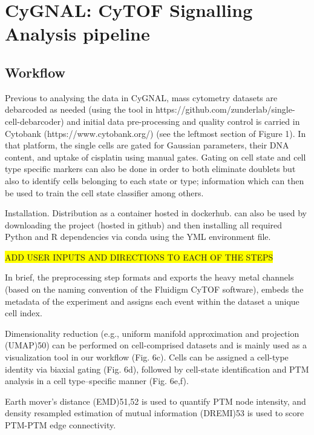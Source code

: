 \section{CyGNAL: CyTOF Signalling Analysis pipeline}

\subsection{Workflow}

Previous to analysing the data in CyGNAL, mass cytometry datasets are debarcoded as needed (using the tool in https://github.com/zunderlab/single-cell-debarcoder) and initial data pre-processing and quality control is carried in Cytobank (https://www.cytobank.org/) (see the leftmost section of Figure 1). In that platform, the single cells are gated for Gaussian parameters, their DNA content, and uptake of cisplatin using manual gates. Gating on cell state and cell type specific markers can also be done in order to both eliminate doublets but also to identify cells belonging to each state or type; information which can then be used to train the cell state classifier among others.

Installation. Distribution as a container hosted in dockerhub. can also be used by downloading the project (hosted in github) and then installing all required Python and R dependencies via conda using the YML environment file.


\colorbox{yellow}{ADD USER INPUTS AND DIRECTIONS TO EACH OF THE STEPS}

In brief, the preprocessing step formats and exports the heavy metal channels (based on the naming convention of the Fluidigm CyTOF software), embeds the metadata of the experiment and assigns each event within the dataset a unique cell index. 


Dimensionality reduction (e.g., uniform manifold approximation and projection (UMAP)50) can be performed on cell-comprised datasets and is mainly used as a visualization tool in our workflow (Fig. 6c). Cells can be assigned a cell-type identity via biaxial gating (Fig. 6d), followed by cell-state identification and PTM analysis in a cell type–specific manner (Fig. 6e,f). 


Earth mover’s distance (EMD)51,52 is used to quantify PTM node intensity, and density resampled estimation of mutual information (DREMI)53 is used to score PTM-PTM edge connectivity. 


